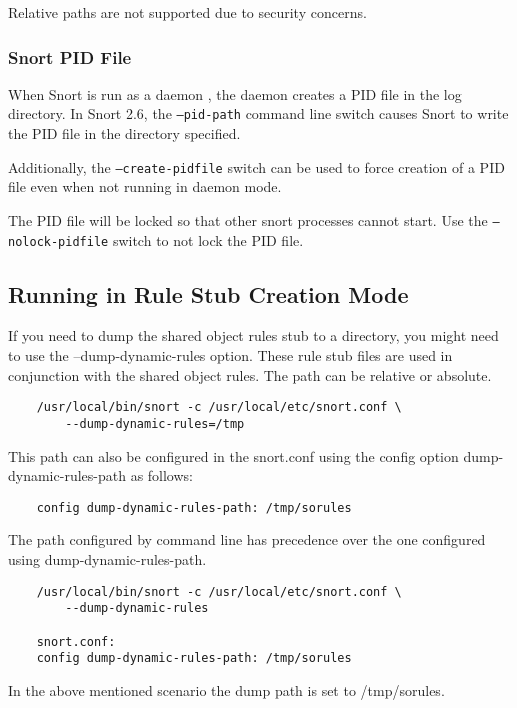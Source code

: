 \documentclass[english]{report}
\begin{document}
Relative paths are not supported due to security concerns.

\subsubsection{Snort PID File}

When Snort is run as a daemon , the daemon creates a PID file in the log
directory.  In Snort 2.6, the \texttt{--pid-path} command line switch causes
Snort to write the PID file in the directory specified.

Additionally, the \texttt{--create-pidfile} switch can be used to force
creation of a PID file even when not running in daemon mode.

The PID file will be locked so that other snort processes cannot start.  Use
the \texttt{--nolock-pidfile} switch to not lock the PID file.

\subsection{Running in Rule Stub Creation Mode}

If you need to dump the shared object rules stub to a directory, you might need to use the --dump-dynamic-rules option. These rule stub files are used in conjunction with the shared object rules. The path can be relative or absolute. 

\begin{verbatim}
    /usr/local/bin/snort -c /usr/local/etc/snort.conf \
        --dump-dynamic-rules=/tmp
\end{verbatim}

This path can also be configured in the snort.conf using the config option dump-dynamic-rules-path as follows:

\begin{verbatim}
    config dump-dynamic-rules-path: /tmp/sorules
\end{verbatim}

The path configured by command line has precedence over the one configured using dump-dynamic-rules-path. 

\begin{verbatim}
    /usr/local/bin/snort -c /usr/local/etc/snort.conf \
        --dump-dynamic-rules

    snort.conf:
    config dump-dynamic-rules-path: /tmp/sorules
\end{verbatim}

In the above mentioned scenario the dump path is set to /tmp/sorules.
\end{document}
